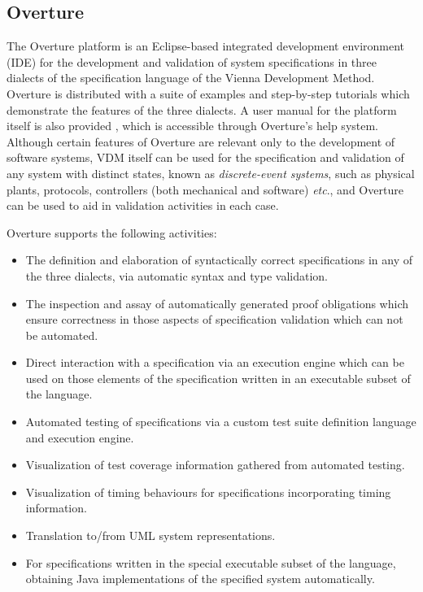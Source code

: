 \subsection{Overture}
The Overture platform \cite{Larsen&10a} is an Eclipse-based integrated development environment (IDE) for the development and validation of system specifications in three dialects of the specification language of the Vienna Development Method.
%
Overture is distributed with a suite of examples and step-by-step tutorials which demonstrate the features of the three dialects.
%
A user manual for the platform itself is also provided \cite{Larsen&13a}, which is accessible through Overture's help system.
%
Although certain features of Overture are relevant only to the development of software systems, VDM itself can be used for the specification and validation of any system with distinct states, known as \emph{discrete-event systems}, such as physical plants, protocols, controllers (both mechanical and software) \emph{etc}.\@, and Overture can be used to aid in validation activities in each case.

Overture supports the following activities:
%
%
%
\begin{itemize}
%
\item  The definition and elaboration of syntactically correct specifications in any of the three dialects, via automatic syntax and type validation.
%
\item  The inspection and assay of automatically generated proof obligations which ensure correctness in those aspects of specification validation which can not be automated.
%
\item  Direct interaction with a specification via an execution engine which can be used on those elements of the specification written in an executable subset of the language.
%
\item  Automated testing of specifications via a custom test suite definition language and execution engine.
%
\item  Visualization of test coverage information gathered from automated testing.
%
\item  Visualization of timing behaviours for specifications incorporating timing information.
%
\item  Translation to/from UML system representations.
%
\item  For specifications written in the special executable subset of the language, obtaining Java implementations of the specified system automatically.
%
\end{itemize}
%
%
%

